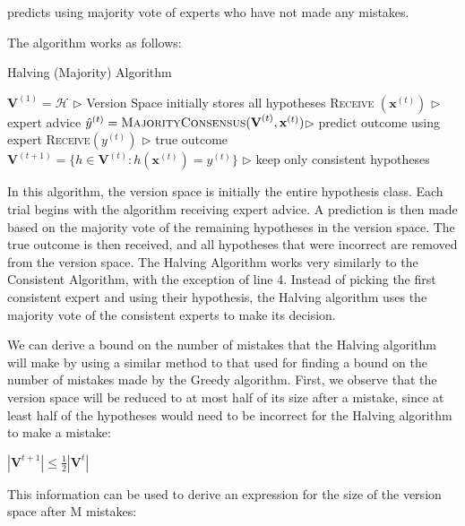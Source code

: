 \documentclass[11pt]{article}
\begin{document}
 predicts using majority vote of experts who have not made any mistakes.

\normalfont
The algorithm works as follows:

\begin{algorithm}[H]
\caption{Halving (Majority) Algorithm}
\label{algo:HMA}
\begin{algorithmic}[1]
\STATE $\textbf{V}^{(1)} = \mathcal{H}$ \hfill $\triangleright$ Version Space initially stores all hypotheses
\STATE \textsc{Receive} $(\textbf{x}^{(t)})$ \hfill $\triangleright$ expert advice
\STATE $\hat{y}^{(t)} = \textsc{MajorityConsensus} (\textbf{V}^{(t)}, \textbf{x}^{(t)})$\hfill $\triangleright$ predict outcome using expert
\STATE \textsc{Receive}$(y^{(t)})$ \hfill $\triangleright$ true outcome
\STATE $\textbf{V}^{(t+1)} = \{h \in \textbf{V}^{(t)} : h(\textbf{x}^{(t)}) = y^{(t)}\}$ \hfill $\triangleright$ keep only consistent hypotheses
\ENDFOR
\end{algorithmic}
\end{algorithm}

\normalfont
In this algorithm, the version space is initially the entire hypothesis class. Each trial begins with the algorithm receiving expert advice. A prediction is then made based on the majority vote of the remaining hypotheses in the version space. The true outcome is then received, and all hypotheses that were incorrect are removed from the version space. The Halving Algorithm works very similarly to the Consistent Algorithm, with the exception of line 4. Instead of picking the first consistent expert and using their hypothesis, the Halving algorithm uses the majority vote of the consistent experts to make its decision. 

\normalfont
We can derive a bound on the number of mistakes that the Halving algorithm will make by using a similar method to that used for finding a bound on the number of mistakes made by the Greedy algorithm. First, we observe that the version space will be reduced to at most half of its size after a mistake, since at least half of the hypotheses would need to be incorrect for the Halving algorithm to make a mistake:

\begin{center}
    $|\textbf{V}^{t+1}| \leq \frac{1}{2}|\textbf{V}^t|$
\end{center}

This information can be used to derive an expression for the size of the version space after M mistakes:
\end{document}
